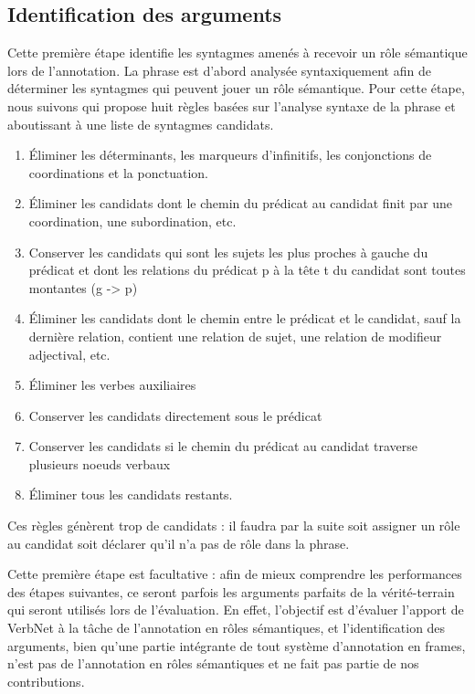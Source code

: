 \subsection{Identification des arguments}


Cette première étape identifie les syntagmes amenés à recevoir un rôle
sémantique lors de l'annotation. La phrase est d'abord analysée syntaxiquement
afin de déterminer les syntagmes qui peuvent jouer un rôle sémantique. Pour
cette étape, nous suivons \cite{lang2011unsupervised} qui propose huit règles
basées sur l'analyse syntaxe de la phrase et aboutissant à une liste de
syntagmes candidats.

\begin{enumerate}
    \item Éliminer les déterminants, les marqueurs d'infinitifs, les conjonctions de coordinations et la ponctuation.
    \item Éliminer les candidats dont le chemin du prédicat au candidat finit par une coordination, une subordination, etc.
    \item Conserver les candidats qui sont les sujets les plus proches à gauche du prédicat et dont les relations du prédicat p à la tête t du candidat sont toutes montantes (g -> p)
    \item Éliminer les candidats  dont le chemin entre le prédicat et le candidat, sauf la dernière relation, contient une relation de sujet, une relation de modifieur adjectival, etc.
    \item Éliminer les verbes auxiliaires
    \item Conserver les candidats directement sous le prédicat
    \item Conserver les candidats si le chemin du prédicat au candidat traverse plusieurs noeuds verbaux
    \item Éliminer tous les candidats restants.
\end{enumerate}


Ces règles génèrent trop de candidats : il faudra par la suite soit assigner un
rôle au candidat soit déclarer qu'il n'a pas de rôle dans la phrase.


Cette première étape est facultative : afin de mieux comprendre les
performances des étapes suivantes, ce seront parfois les arguments parfaits de
la vérité-terrain qui seront utilisés lors de l'évaluation. En effet,
l'objectif est d'évaluer l'apport de VerbNet à la tâche de l'annotation en
rôles sémantiques, et l'identification des arguments, bien qu'une partie
intégrante de tout système d'annotation en frames, n'est pas de l'annotation en
rôles sémantiques \citep{das2010probabilistic} et ne fait pas partie de nos
contributions.

